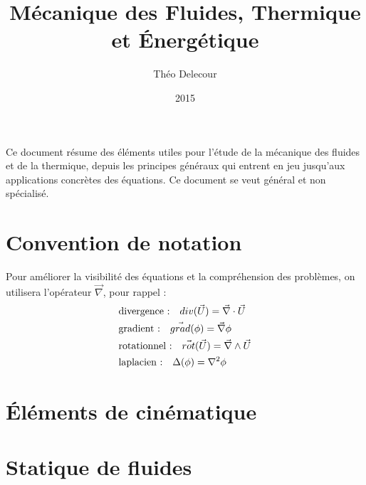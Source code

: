 \documentclass[10pt,a4paper,twocolumn,fleqn]{article}
\title{Mécanique des Fluides, Thermique et Énergétique}
\author{Théo Delecour}
\date{2015}
\begin{document}
\makeatletter

\begin{center}
 \LARGE \@title

 \Large \@author
\end{center}

\makeatother

Ce document résume des éléments utiles pour l'étude de la mécanique des fluides et de la thermique, depuis les principes généraux qui entrent en jeu jusqu'aux applications concrètes des équations. Ce document se veut général et non spécialisé.



\section*{Convention de notation}
Pour améliorer la visibilité des équations et la compréhension des problèmes, on utilisera l'opérateur $\vec{\nabla}$, pour rappel :
%
\begin{align}
\notag &\text{divergence :} \quad div (\vec{U}) = \vec{\nabla} \cdot \vec{U} \\
\notag &\text{gradient :} \quad \vec{grad} (\phi) = \vec{\nabla} \phi \\
\notag &\text{rotationnel :} \quad \vec{rot} (\vec{U}) = \vec{\nabla} \wedge \vec{U} \\
\notag &\text{laplacien :} \quad \Delta (\phi) = \nabla^2 \phi
\end{align}



\section{Éléments de cinématique}


\section{Statique de fluides}\label{sec:statique} %


\end{document}
